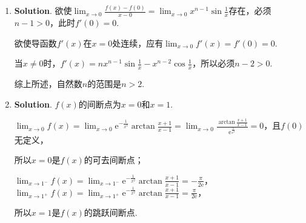 \documentclass[../Main.tex]{subfiles}
\begin{document}
\begin{enumerate}
    \item \textbf{Solution}. 欲使$\lim_{x\to0}\frac{f(x)-f(0)}{x-0}=\lim_{x\to0}x
                  ^{n-1}\sin\frac{1}{x}$存在，必须$n-1>0$，此时$f'(0)=0$.

          欲使导函数$f'(x)$在$x=0$处连续，应有$\lim_{x\to0}f'(x)=f'(0)=0$.

          当$x\neq0$时，$f'(x)=nx^{n-1}\sin\frac{1}{x}-x^{n-2}\cos\frac{1}{x}$，所以必须$n
              -2>0$.

          综上所述，自然数$n$的范围是$n>2$.

    \item \textbf{Solution}. $f(x)$的间断点为$x=0$和$x=1$.

          $\lim_{x\to0}f(x)=\lim_{x\to0}\mathrm{e}^{-\frac{1}{x^{2}}}\arctan\frac{x+1}{x-1}
              =\lim_{x\to0}\frac{\arctan\frac{x+1}{x-1}}{\mathrm{e}^{\frac{1}{x^2}}}=0$，且$f
              (0)$无定义，

          所以$x=0$是$f(x)$的可去间断点；

          $\lim_{x\to1^-}f(x)=\lim_{x\to1^-}\mathrm{e}^{-\frac{1}{x^{2}}}\arctan\frac{x+1}{x-1}
              =-\frac{\pi}{2\mathrm{e}}$，$\lim_{x\to1^+}f(x)=\lim_{x\to1^+}\mathrm{e}^{-\frac{1}{x^{2}}}
              \arctan\frac{x+1}{x-1}=\frac{\pi}{2\mathrm{e}}$，

          所以$x=1$是$f(x)$的跳跃间断点.
\end{enumerate}
\end{document}
